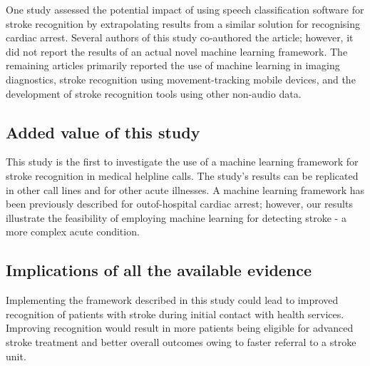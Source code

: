 {One study assessed the potential impact of using speech classification software for stroke recognition by extrapolating results from a similar solution for recognising cardiac arrest. Several authors of this study co-authored the article; however, it did not report the results of an actual novel machine learning framework. The remaining articles primarily reported the use of machine learning in imaging diagnostics, stroke recognition using movement-tracking mobile devices, and the development of stroke recognition tools using other non-audio data.

\subsection{Added value of this study}

This study is the first to investigate the use of a machine learning framework for stroke recognition in medical helpline calls. The study's results can be replicated in other call lines and for other acute illnesses. A machine learning framework has been previously described for outof-hospital cardiac arrest; however, our results illustrate the feasibility of employing machine learning for detecting stroke - a more complex acute condition.

\subsection{Implications of all the available evidence}

Implementing the framework described in this study could lead to improved recognition of patients with stroke during initial contact with health services. Improving recognition would result in more patients being eligible for advanced stroke treatment and better overall outcomes owing to faster referral to a stroke unit.

}
